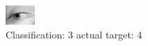\begin{figure}[h!]
\begin{center}
\includegraphics[width=0.60\columnwidth]{figures/ID3001_class_3_target_4.png}
\end{center}
\caption{ Classification: 3 actual target: 4}
\label{fig:ID3001_class_3_target_4}
\end{figure}
